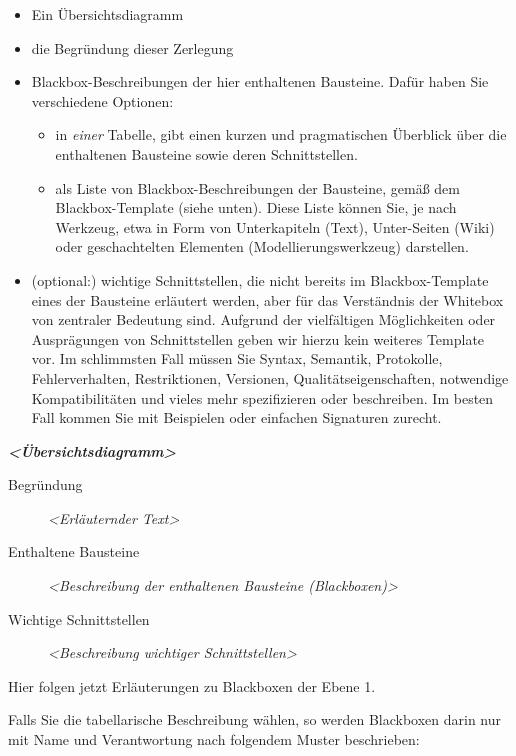 \begin{itemize}
\tightlist
\item
  Ein Übersichtsdiagramm
\item
  die Begründung dieser Zerlegung
\item
  Blackbox-Beschreibungen der hier enthaltenen Bausteine. Dafür haben
  Sie verschiedene Optionen:

  \begin{itemize}
  \tightlist
  \item
    in \emph{einer} Tabelle, gibt einen kurzen und pragmatischen
    Überblick über die enthaltenen Bausteine sowie deren Schnittstellen.
  \item
    als Liste von Blackbox-Beschreibungen der Bausteine, gemäß dem
    Blackbox-Template (siehe unten). Diese Liste können Sie, je nach
    Werkzeug, etwa in Form von Unterkapiteln (Text), Unter-Seiten (Wiki)
    oder geschachtelten Elementen (Modellierungswerkzeug) darstellen.
  \end{itemize}
\item
  (optional:) wichtige Schnittstellen, die nicht bereits im
  Blackbox-Template eines der Bausteine erläutert werden, aber für das
  Verständnis der Whitebox von zentraler Bedeutung sind. Aufgrund der
  vielfältigen Möglichkeiten oder Ausprägungen von Schnittstellen geben
  wir hierzu kein weiteres Template vor. Im schlimmsten Fall müssen Sie
  Syntax, Semantik, Protokolle, Fehlerverhalten, Restriktionen,
  Versionen, Qualitätseigenschaften, notwendige Kompatibilitäten und
  vieles mehr spezifizieren oder beschreiben. Im besten Fall kommen Sie
  mit Beispielen oder einfachen Signaturen zurecht.
\end{itemize}

\textbf{\emph{\textless Übersichtsdiagramm\textgreater{}}}

\begin{description}
\item[Begründung]
\emph{\textless Erläuternder Text\textgreater{}}
\item[Enthaltene Bausteine]
\emph{\textless Beschreibung der enthaltenen Bausteine
(Blackboxen)\textgreater{}}
\item[Wichtige Schnittstellen]
\emph{\textless Beschreibung wichtiger Schnittstellen\textgreater{}}
\end{description}

Hier folgen jetzt Erläuterungen zu Blackboxen der Ebene 1.

Falls Sie die tabellarische Beschreibung wählen, so werden Blackboxen
darin nur mit Name und Verantwortung nach folgendem Muster beschrieben:

